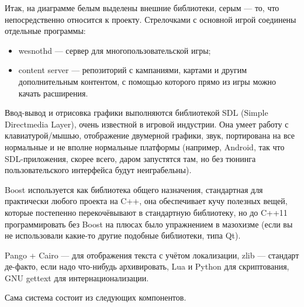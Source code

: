 \documentclass{../../text-style}
\begin{document}
Итак, на диаграмме белым выделены внешние библиотеки, серым --- то, что непосредственно относится к проекту. Стрелочками с основной игрой соединены отдельные программы:

\begin{itemize}
    \item wesnothd --- сервер для многопользовательской игры;
    \item content server --- репозиторий с кампаниями, картами и другим дополнительным контентом, с помощью которого прямо из игры можно качать расширения.
\end{itemize}

Ввод-вывод и отрисовка графики выполняются библиотекой SDL (Simple Directmedia Layer), очень известной в игровой индустрии. Она умеет работу с клавиатурой/мышью, отображение двумерной графики, звук, портирована на все нормальные и не вполне нормальные платформы (например, Android, так что SDL-приложения, скорее всего, даром запустятся там, но без тюнинга пользовательского интерфейса будут неиграбельны).

Boost используется как библиотека общего назначения, стандартная для практически любого проекта на C++, она обеспечивает кучу полезных вещей, которые постепенно перекочёвывают в стандартную библиотеку, но до C++11 программировать без Boost на плюсах было упражнением в мазохизме (если вы не использовали какие-то другие подобные библиотеки, типа Qt).

Pango + Cairo --- для отображения текста с учётом локализации, zlib --- стандарт де-факто, если надо что-нибудь архивировать, Lua и Python для скриптования, GNU gettext для интернационализации.

Сама система состоит из следующих компонентов.
\end{document}
